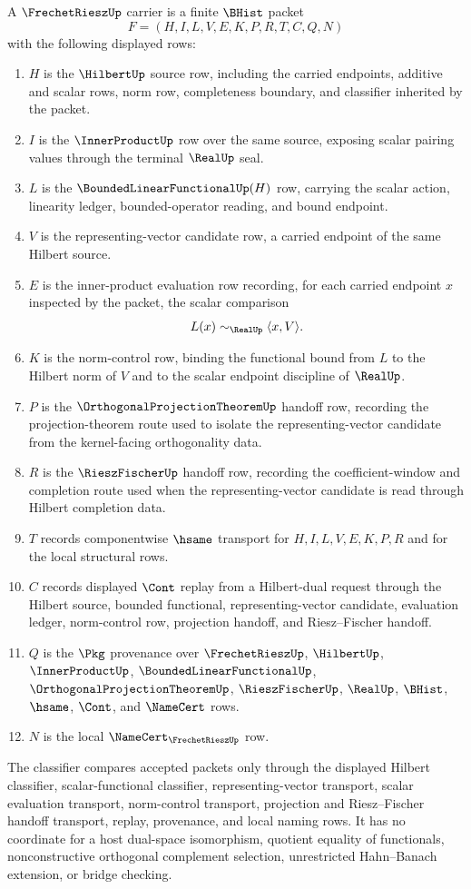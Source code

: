 \begin{definition}
\label{def:frechet-riesz-carrier}
A $\FrechetRieszUp$ carrier is a finite $\BHist$ packet
$$
F=(H,I,L,V,E,K,P,R,T,C,Q,N)
$$
with the following displayed rows:
\begin{enumerate}
\item $H$ is the $\HilbertUp$ source row, including the carried endpoints, additive and scalar rows, norm row, completeness boundary, and classifier inherited by the packet.
\item $I$ is the $\InnerProductUp$ row over the same source, exposing scalar pairing values through the terminal $\RealUp$ seal.
\item $L$ is the $\BoundedLinearFunctionalUp(H)$ row, carrying the scalar action, linearity ledger, bounded-operator reading, and bound endpoint.
\item $V$ is the representing-vector candidate row, a carried endpoint of the same Hilbert source.
\item $E$ is the inner-product evaluation row recording, for each carried endpoint $x$ inspected by the packet, the scalar comparison
$$
L(x) \sim_{\RealUp} \langle x,V\rangle .
$$
\item $K$ is the norm-control row, binding the functional bound from $L$ to the Hilbert norm of $V$ and to the scalar endpoint discipline of $\RealUp$.
\item $P$ is the $\OrthogonalProjectionTheoremUp$ handoff row, recording the projection-theorem route used to isolate the representing-vector candidate from the kernel-facing orthogonality data.
\item $R$ is the $\RieszFischerUp$ handoff row, recording the coefficient-window and completion route used when the representing-vector candidate is read through Hilbert completion data.
\item $T$ records componentwise $\hsame$ transport for $H,I,L,V,E,K,P,R$ and for the local structural rows.
\item $C$ records displayed $\Cont$ replay from a Hilbert-dual request through the Hilbert source, bounded functional, representing-vector candidate, evaluation ledger, norm-control row, projection handoff, and Riesz--Fischer handoff.
\item $Q$ is the $\Pkg$ provenance over $\FrechetRieszUp$, $\HilbertUp$, $\InnerProductUp$, $\BoundedLinearFunctionalUp$, $\OrthogonalProjectionTheoremUp$, $\RieszFischerUp$, $\RealUp$, $\BHist$, $\hsame$, $\Cont$, and $\NameCert$ rows.
\item $N$ is the local $\NameCert_{\FrechetRieszUp}$ row.
\end{enumerate}
The classifier compares accepted packets only through the displayed Hilbert classifier, scalar-functional classifier, representing-vector transport, scalar evaluation transport, norm-control transport, projection and Riesz--Fischer handoff transport, replay, provenance, and local naming rows. It has no coordinate for a host dual-space isomorphism, quotient equality of functionals, nonconstructive orthogonal complement selection, unrestricted Hahn--Banach extension, or bridge checking.
\end{definition}
